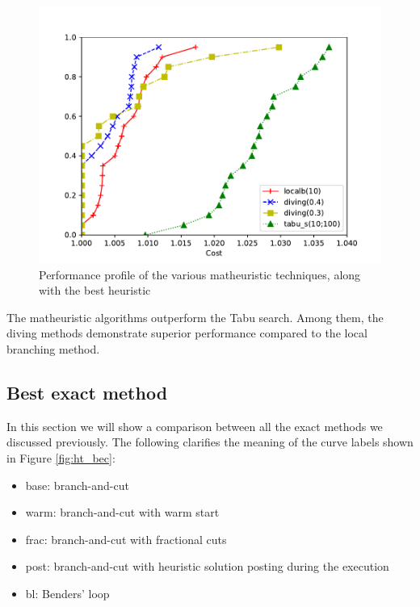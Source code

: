 \documentclass{article}
\begin{document}
\begin{figure}[ht]
        \caption{Performance profile of the various matheuristic techniques, along with the best heuristic}
        \label{fig:math_vs_tabu}
        \centering
        \includegraphics[width=340pt]{assets/math_vs_tabu.pdf}
\end{figure}

The matheuristic algorithms outperform the Tabu search.
Among them, the diving methods demonstrate superior performance compared to the local branching method.

\clearpage
\newpage

\subsection{Best exact method}
In this section we will show a comparison between all the exact methods
we discussed previously.
The following clarifies the meaning of the curve labels shown in Figure \ref{fig:ht_bec}:
\begin{itemize}
\item base: branch-and-cut
\item warm: branch-and-cut with warm start
\item frac: branch-and-cut with fractional cuts
\item post: branch-and-cut with heuristic solution posting during the execution
\item bl: Benders' loop
\end{itemize}
\end{document}
